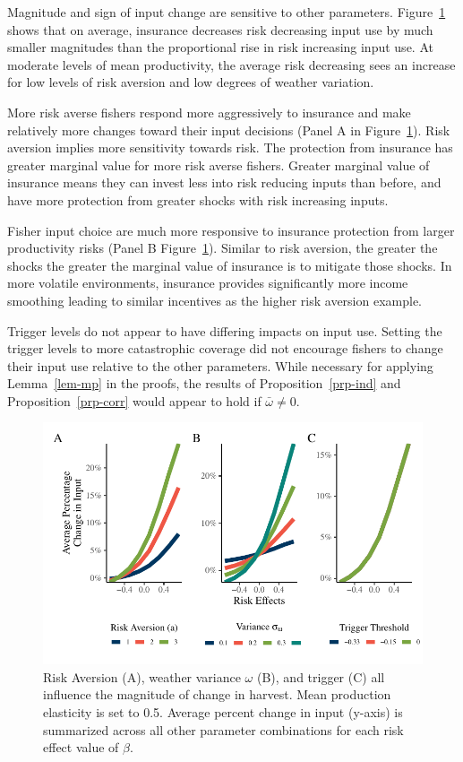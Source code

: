 \documentclass[
  letterpaper,
  DIV=11,
  numbers=noendperiod]{scrartcl}
\theoremstyle{plain}
\theoremstyle{plain}
\theoremstyle{remark}
\begin{document}
Magnitude and sign of input change are sensitive to other parameters.
Figure~\ref{fig-sum} shows that on average, insurance decreases risk
decreasing input use by much smaller magnitudes than the proportional
rise in risk increasing input use. At moderate levels of mean
productivity, the average risk decreasing sees an increase for low
levels of risk aversion and low degrees of weather variation.

More risk averse fishers respond more aggressively to insurance and make
relatively more changes toward their input decisions (Panel A in
Figure~\ref{fig-sum}). Risk aversion implies more sensitivity towards
risk. The protection from insurance has greater marginal value for more
risk averse fishers. Greater marginal value of insurance means they can
invest less into risk reducing inputs than before, and have more
protection from greater shocks with risk increasing inputs.

Fisher input choice are much more responsive to insurance protection
from larger productivity risks (Panel B Figure~\ref{fig-sum}). Similar
to risk aversion, the greater the shocks the greater the marginal value
of insurance is to mitigate those shocks. In more volatile environments,
insurance provides significantly more income smoothing leading to
similar incentives as the higher risk aversion example.

Trigger levels do not appear to have differing impacts on input use.
Setting the trigger levels to more catastrophic coverage did not
encourage fishers to change their input use relative to the other
parameters. While necessary for applying Lemma~\ref{lem-mp} in the
proofs, the results of Proposition~\ref{prp-ind} and
Proposition~\ref{prp-corr} would appear to hold if \(\bar\omega\ne0\).

\begin{figure}

{\centering \includegraphics{ibi-behavior_files/figure-pdf/fig-sum-1.pdf}

}

\caption{\label{fig-sum}Risk Aversion (A), weather variance \(\omega\)
(B), and trigger (C) all influence the magnitude of change in harvest.
Mean production elasticity is set to 0.5. Average percent change in
input (y-axis) is summarized across all other parameter combinations for
each risk effect value of \(\beta\).}

\end{figure}
\end{document}
